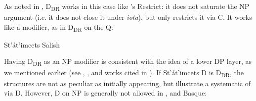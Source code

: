 \documentclass[output=paper,
modfonts
]{langscibook}
\begin{document}
As noted in \citet{Giannakidou2004}, D\textsubscript{DR} works in this case like \citet{chung-ladusaw2003}'s Restrict: it does not saturate the NP argument (i.e. it does not close it under \textit{iota}), but only restricts it via C. It works like a modifier, as in D\textsubscript{DR} on the Q:

\ea\label{ex:etxeberria:37} St'át'imcets Salish \\
\z
\z

\z

\z 

Having D\textsubscript{DR} as an NP modifier is consistent with the idea of a lower DP layer, as we mentioned earlier (see \citealt{szabolcsi1987}, \citealt{szabolcsi2010}, and works cited in \citealt{AlexiadouEtAlii2008}). If St'\'at'imcets D is D\textsubscript{DR}, the  structures are not as peculiar as initially appearing, but illustrate a systematic  of  via D. However, D on NP is generally not allowed in ,  and Basque:

\ea\label{ex:etxeberria:38}
	\z
\z

\ea\label{ex:etxeberria:39}  \\
\z
\z
\end{document}
